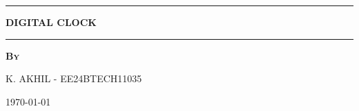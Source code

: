 \begin{titlepage}
\begin{center}
\vfill
\vspace{6cm}
\hrule
\vspace{.5cm}
{\huge \bfseries DIGITAL CLOCK} %
\vspace{.5cm}

\hrule
\vspace{1.5cm}

\textsc{\textbf{By}}\\
\vspace{.5cm}

K. AKHIL - EE24BTECH11035\\

\vspace{2cm}

\today %

\vfill
\end{center}
\end{titlepage}
